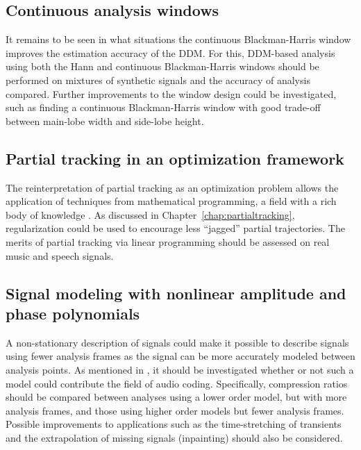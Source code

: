 \subsection{Continuous analysis windows}

It remains to be seen in what situations the continuous Blackman-Harris window
improves the estimation accuracy of the DDM. For this, DDM-based analysis using
both the Hann and continuous Blackman-Harris windows should
be performed on mixtures of synthetic signals and the accuracy of
analysis compared. Further improvements to the window design could be
investigated, such as finding a continuous Blackman-Harris window with good
trade-off between main-lobe width and side-lobe height.

\subsection{Partial tracking in an optimization framework}

The reinterpretation of partial tracking as an optimization problem allows the
application of techniques from mathematical programming, a field with
a rich body of knowledge \cite{boyd2004convex}. As discussed in
Chapter~\ref{chap:partialtracking}, regularization could be used to encourage
less ``jagged'' partial trajectories. The merits of partial tracking via
linear programming should be assessed on real music and speech signals.

\subsection{Signal modeling with nonlinear amplitude and phase polynomials}

A non-stationary description of signals could make it possible to describe
signals using fewer analysis frames as the signal can be more accurately modeled
between analysis points. As mentioned in \cite{betser2009sinusoidal}, it should
be investigated whether or not such a model could contribute the field of audio
coding. Specifically, compression ratios should be compared between analyses
using a lower order model, but with more analysis frames, and those using higher order
models but fewer analysis frames. Possible improvements to applications such as
the time-stretching of transients and the extrapolation of missing signals
(inpainting) should also be considered.
